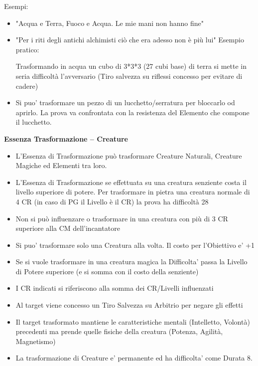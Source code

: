 \documentclass[a4paper,11pt,twoside,openany]{book}
\begin{document}
Esempi:
\begin{itemize}
	\item
	      "Acqua e Terra, Fuoco e Acqua. Le mie mani non hanno fine"
	\item
	      "Per i riti degli antichi alchimisti ciò che era adesso non è più lui"
	      Esempio pratico:

	      Trasformando in acqua un cubo di 3{*}3{*}3 (27 cubi base) di terra si mette in seria difficoltà l'avversario (Tiro salvezza su riflessi concesso per evitare di cadere)
	\item
		  Si puo' trasformare un pezzo di un lucchetto/serratura per bloccarlo od aprirlo. La prova va confrontata con la resistenza del Elemento che compone il lucchetto.      
\end{itemize}

\bigskip

\textbf{Essenza Trasformazione -- Creature}

\begin{itemize}
	\item
	      L'Essenza di Trasformazione può trasformare Creature Naturali, Creature Magiche ed Elementi tra loro.
	\item
	      L'Essenza di Trasformazione se effettuata su una creatura senziente costa il livello superiore di potere. Per trasformare in pietra una creatura normale di 4 CR (in caso di PG il Livello è il CR) la prova ha difficoltà 28
	\item
	      Non si può influenzare o trasformare in una creatura con più di 3 CR superiore alla CM dell'incantatore
   	\item 
   		  Si puo' trasformare solo una Creatura alla volta. Il costo per l'Obiettivo e' +1
	\item
	      Se si vuole trasformare in una creatura magica la Difficolta' passa la Livello di Potere superiore (e si somma con il costo della senziente)
	\item
	      I CR indicati si riferiscono alla somma dei CR/Livelli influenzati
	\item
	      Al target viene concesso un Tiro Salvezza su Arbitrio per negare gli effetti
	\item
	      Il target trasformato mantiene le caratteristiche mentali (Intelletto, Volontà) precedenti ma prende quelle fisiche della creatura (Potenza, Agilità, Magnetismo)

    \item
          La trasformazione di Creature e' permanente ed ha difficolta' come Durata 8.      
	      
\end{itemize}
\end{document}
